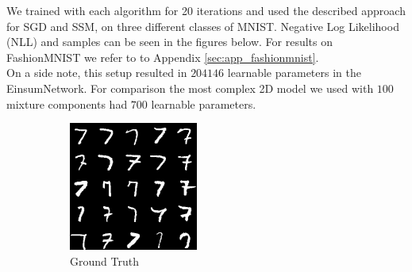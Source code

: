 We trained with each algorithm for 20 iterations and used the described approach for SGD and SSM, on three different classes of MNIST. 
Negative Log Likelihood (NLL) and samples can be seen in the figures below.
For results on FashionMNIST we refer to to Appendix \ref{sec:app_fashionmnist}. \\

On a side note, this setup resulted in $204146$ learnable parameters in the EinsumNetwork. For comparison the most 
complex 2D model we used with $100$ mixture components had $700$ learnable parameters. 

\begin{figure}[H]
    \centering
    \begin{subfigure}[b]{0.24\textwidth}
        \centering
        \includegraphics[width=\textwidth]{figures/einsum/mnist/[7]_ground_truth.png}
        \caption{Ground Truth}
    \end{subfigure}
    \begin{subfigure}[b]{0.24\textwidth}
        \centering

\end{subfigure}
\end{figure}
